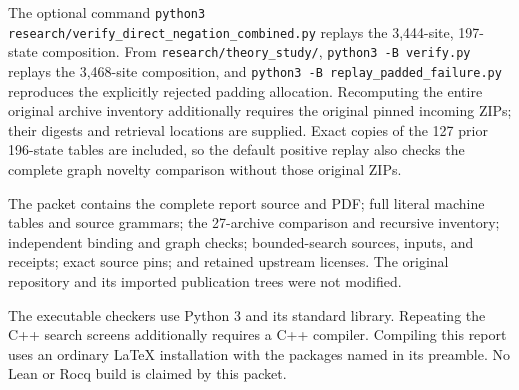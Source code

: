 \documentclass[11pt,letterpaper]{article}
\newcommand{\file}[1]{\texttt{\nolinkurl{#1}}}
\begin{document}
The optional command \file{python3 research/verify_direct_negation_combined.py}
replays the 3,444-site, 197-state composition. From
\file{research/theory_study/}, \file{python3 -B verify.py} replays the
3,468-site composition, and \file{python3 -B replay_padded_failure.py}
reproduces the explicitly rejected padding allocation. Recomputing the
entire original archive inventory additionally requires the original
pinned incoming ZIPs; their digests and retrieval locations are supplied.
Exact copies of the 127 prior 196-state tables are included, so the
default positive replay also checks the complete graph novelty comparison
without those original ZIPs.

The packet contains the complete report source and PDF; full literal
machine tables and source grammars; the 27-archive comparison and recursive
inventory; independent binding and graph checks; bounded-search sources,
inputs, and receipts; exact source pins; and retained upstream licenses.
The original repository and its imported publication trees were not
modified.

The executable checkers use Python 3 and its standard library. Repeating
the C++ search screens additionally requires a C++ compiler. Compiling
this report uses an ordinary LaTeX installation with the packages named
in its preamble. No Lean or Rocq build is claimed by this packet.
\end{document}
